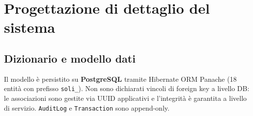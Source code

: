 \documentclass[11pt,a4paper]{article}
\begin{document}
\section{Progettazione di dettaglio del sistema}

\subsection{Dizionario e modello dati}

Il modello \`e persistito su \textbf{PostgreSQL} tramite Hibernate ORM Panache (18 entit\`a con prefisso \texttt{soli\_}). Non sono dichiarati vincoli di foreign key a livello DB: le associazioni sono gestite via UUID applicativi e l'integrit\`a \`e garantita a livello di servizio. \texttt{AuditLog} e \texttt{Transaction} sono append-only.
\end{document}
